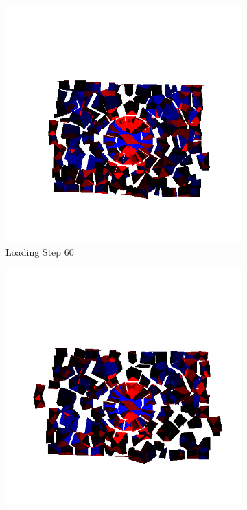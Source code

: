 \begin{figure}[ht!]
    \begin{subfigure}{.33\textwidth}
      \centering
      \includegraphics[width=1.0\linewidth]{Files/Small_ASR/Free_IS2/DEP5-STEP(080).png}
      \caption{Loading Step 60}
    \end{subfigure}%
    \begin{subfigure}{.33\textwidth}
      \centering
      \includegraphics[width=1.0\linewidth]{Files/Small_ASR/Free_IS2/DEP5-STEP(100).png}

\end{subfigure}
\end{figure}
